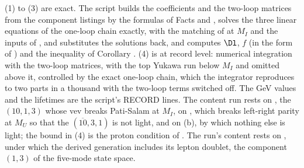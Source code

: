 (1) to (3) are exact. The script builds the coefficients and the two-loop matrices from the component listings by the formulas of Facts  and , solves the three linear equations of the one-loop chain exactly, with the matching of  at $M_{I}$ and the inputs of , and substitutes the solutions back, and computes $\Dl$, $f$ (in the form of ) and the inequality of Corollary . (4) is at record level: numerical integration with the two-loop matrices, with the top Yukawa run below $M_{I}$ and omitted above it, controlled by the exact one-loop chain, which the integrator reproduces to two parts in a thousand with the two-loop terms switched off. The GeV values and the lifetimes are the script's RECORD lines. The content run rests on , the $(10,1,3)$ whose vev breaks Pati-Salam at $M_{I}$, on , which breaks left-right parity at $M_{U}$ so that the $(\overline{10},3,1)$ is not light, and on (b), by which nothing else is light; the bound in (4) is the proton condition of . The run's content rests on , under which the derived generation includes its lepton doublet, the component $(1,3)$ of the five-mode state space.
